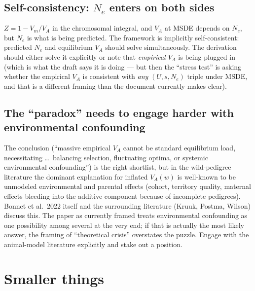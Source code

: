 \documentclass[11pt]{article}
\begin{document}
\subsection{Self-consistency: $N_e$ enters on both sides}

$Z = 1 - V_m/V_A$ in the chromosomal integral, and $V_A$ at MSDE
depends on $N_e$, but $N_e$ is what is being predicted. The framework
is implicitly self-consistent: predicted $N_e$ and equilibrium $V_A$
should solve simultaneously. The derivation should either solve it
explicitly or note that \emph{empirical} $V_A$ is being plugged in
(which is what the draft says it is doing --- but then the ``stress
test'' is asking whether the empirical $V_A$ is consistent with
\emph{any} $(U, s, N_e)$ triple under MSDE, and that is a different
framing than the document currently makes clear).

\subsection{The ``paradox'' needs to engage harder with environmental confounding}

The conclusion (``massive empirical $V_A$ cannot be standard
equilibrium load, necessitating \dots\ balancing selection,
fluctuating optima, or systemic environmental confounding'') is the
right shortlist, but in the wild-pedigree literature the dominant
explanation for inflated $V_A(w)$ is well-known to be unmodeled
environmental and parental effects (cohort, territory quality,
maternal effects bleeding into the additive component because of
incomplete pedigrees). Bonnet et al.\ 2022 itself and the surrounding
literature (Kruuk, Postma, Wilson) discuss this. The paper as
currently framed treats environmental confounding as one possibility
among several at the very end; if that is actually the most likely
answer, the framing of ``theoretical crisis'' overstates the puzzle.
Engage with the animal-model literature explicitly and stake out a
position.

\section{Smaller things}
\end{document}

